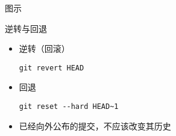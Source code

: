 \begin{frame}{图示}
\end{frame}

\begin{frame}[<+->][fragile]{逆转与回退}
    \begin{itemize}
        \item 逆转（回滚）
        \begin{Verbatim}[frame=single,commandchars=\\\{\}]
git revert HEAD
        \end{Verbatim}
        \item 回退
        \begin{Verbatim}[frame=single,commandchars=\\\{\}]
git reset --hard HEAD~1
        \end{Verbatim}
        \item 已经向外公布的提交，不应该改变其历史
    \end{itemize}
\end{frame}

